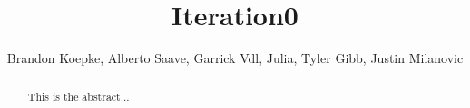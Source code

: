 \begin{frontmatter}
	\title{Iteration0}
	\author{Brandon Koepke, Alberto Saave, Garrick Vdl, Julia, Tyler Gibb, Justin Milanovic}
	\begin{abstract}
		This is the abstract...
	\end{abstract}
\end{frontmatter}
\tableofcontents
\clearpage
